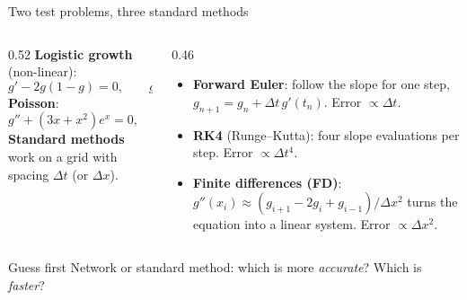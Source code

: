 \documentclass[10pt,aspectratio=169]{beamer}
\begin{document}
\begin{frame}{Two test problems, three standard methods}
\begin{columns}[T]
\begin{column}{0.52\textwidth}
\small
\textbf{Logistic growth} (non-linear):
\[g'-2g(1-g)=0,\qquad g(0)=1.2.\]
\textbf{Poisson}:
\[g''+(3x+x^{2})e^{x}=0,\qquad g(0)=g(1)=0.\]
\textbf{Standard methods} work on a grid with spacing $\Delta t$ (or
$\Delta x$).
\end{column}
\begin{column}{0.46\textwidth}
\small
\begin{itemize}
  \item \textbf{Forward Euler}: follow the slope for one step,
        $g_{n+1}=g_{n}+\Delta t\,g'(t_{n})$.  Error $\propto\Delta t$.
  \item \textbf{RK4} (Runge--Kutta): four slope evaluations per step.
        Error $\propto\Delta t^{4}$.
  \item \textbf{Finite differences (FD)}:
        $g''(x_i)\approx(g_{i+1}-2g_{i}+g_{i-1})/\Delta x^{2}$ turns the
        equation into a linear system.  Error $\propto\Delta x^{2}$.
\end{itemize}
\end{column}
\end{columns}
\vfill
\pause
{}%
%
\begin{block}{Guess first}
Network or standard method: which is more \emph{accurate}?  Which is
\emph{faster}?
\end{block}
\end{frame}
\end{document}
